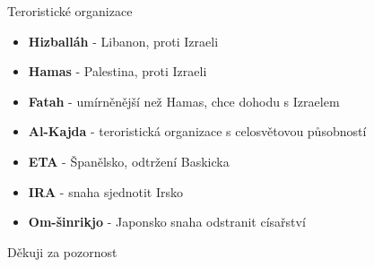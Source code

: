\documentclass[fyma2,pdf,final]{prosper}
\begin{document}
\begin{slide}{Teroristické organizace}
\begin{itemize}
  \item\textbf{Hizballáh} - Libanon, proti Izraeli
  \item\textbf{Hamas} - Palestina, proti Izraeli
  \item\textbf{Fatah} - umírněnější než Hamas, chce dohodu s Izraelem
  \item\textbf{Al-Kajda} - teroristická organizace s celosvětovou působností
  \item\textbf{ETA} - Španělsko, odtržení Baskicka
  \item\textbf{IRA} - snaha sjednotit Irsko
  \item\textbf{Om-šinrikjo} - Japonsko snaha odstranit císařství
\end{itemize}
\end{slide}

\begin{slide}{}
\vspace{54pt}
\begin{center}
{\large Děkuji za pozornost}
\end{center}
\end{slide}
\end{document}
